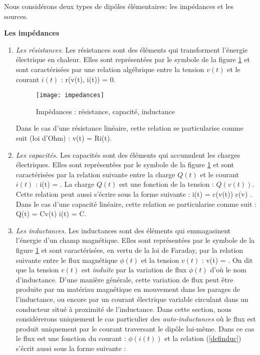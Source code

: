Nous considérons deux types de dip{ô}les élémentaires:
les impédances et les sources.
\begin{description}
\item{\bf Les impédances}
\begin{enumerate}
\item{\em Les résistances}. Les résistances sont des éléments qui transforment l'énergie électrique en chaleur. Elles sont représentées par
le symbole de la figure \ref{fig:impedances} et sont caractérisées
par une relation algébrique entre la tension $v(t)$ et le courant
$i(t)$ :
\eqnn
r(v(t), i(t)) = 0.
\eeqnn
\begin{figure}[t]
\begin{center}
\texttt{[image: impedances]}
\caption{Impédances : résistance, capacité, inductance}
\label{fig:impedances}
\end{center}
\end{figure}
Dans le cas d'une résistance linéaire, cette relation se
particularise comme suit (loi d'Ohm) :
\eqnn
v(t) = Ri(t).
\eeqnn
\item {\em Les capacités.} Les capacités sont des éléments qui accumulent les charges électriques. Elles sont représentées par le
symbole de la figure \ref{fig:impedances} et sont caractérisées par la
relation suivante entre la charge $Q(t)$ et le courant $i(t)$ :
\eqnn
i(t) = .
\eeqnn
La charge $Q(t)$ est une fonction de la tension : $Q(v(t))$.  Cette relation peut aussi
s'écrire sous la forme suivante :
\eqnn
i(t) = c(v(t))  \;\;
 \;\; c(v) \triangleq  {}.
\eeqnn
Dans le cas d'une capacité linéaire, cette relation se
particu\-larise comme suit :
\eqnn
Q(t) = Cv(t) \;\;  \;\; i(t) = C.
\eeqnn
\item{\em Les inductances.}  Les inductances sont des éléments qui emmagasinent l'énergie d'un champ magnétique. Elles sont représentées par le
symbole de la figure \ref{fig:impedances} et sont caractérisées, en vertu de
la loi de Faraday, par la relation suivante entre le flux magnétique $\phi(t)$ et la tension
$v(t)$ :
\eqn
v(t) = . \label{definduc}
\eeqn
On dit que la tension $v(t)$ est {\it induite} par la variation de flux $\phi(t)$ d'où le nom d'inductance. D'une manière générale, cette variation de flux peut être produite par un matériau magnétique en mouvement dans les parages de l'inductance, ou encore par un courant électrique variable circulant dans un conducteur situé à proximité de l'inductance. Dans cette section, nous considérerons uniquement le cas particulier des {\it auto-inductances} où le flux est produit uniquement par le courant traversant le dipôle lui-même. Dans ce cas le flux est une fonction du courant :  $\phi(i(t))$ et la relation (\ref{definduc}) s'écrit aussi sous la forme suivante :

\end{enumerate}
\end{description}
